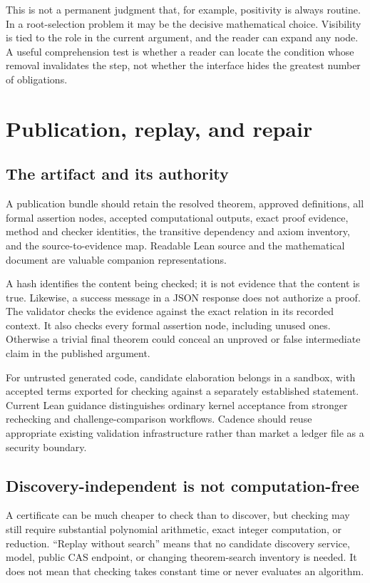 \documentclass[11pt,letterpaper]{article}
\theoremstyle{definition}
\begin{document}
This is not a permanent judgment that, for example, positivity is always routine.
In a root-selection problem it may be the decisive mathematical choice. Visibility
is tied to the role in the current argument, and the reader can expand any node.
A useful comprehension test is whether a reader can locate the condition whose
removal invalidates the step, not whether the interface hides the greatest number
of obligations.

\section{Publication, replay, and repair}\label{sec:replay}
\subsection{The artifact and its authority}
A publication bundle should retain the resolved theorem, approved definitions,
all formal assertion nodes, accepted computational outputs, exact proof evidence,
method and checker identities, the transitive dependency and axiom inventory,
and the source-to-evidence map. Readable Lean source and the mathematical document
are valuable companion representations.

A hash identifies the content being checked; it is not evidence that the content
is true. Likewise, a success message in a JSON response does not authorize a proof.
The validator checks the evidence against the exact relation in its recorded
context. It also checks every formal assertion node, including unused ones.
Otherwise a trivial final theorem could conceal an unproved or false intermediate
claim in the published argument.

For untrusted generated code, candidate elaboration belongs in a sandbox, with
accepted terms exported for checking against a separately established statement.
Current Lean guidance distinguishes ordinary kernel acceptance from stronger
rechecking and challenge-comparison workflows\cite{leanvalidation}. Cadence should
reuse appropriate existing validation infrastructure rather than market a ledger
file as a security boundary.

\subsection{Discovery-independent is not computation-free}
A certificate can be much cheaper to check than to discover, but checking may still
require substantial polynomial arithmetic, exact integer computation, or reduction.
``Replay without search'' means that no candidate discovery service, model, public
CAS endpoint, or changing theorem-search inventory is needed. It does not mean
that checking takes constant time or never evaluates an algorithm.
\end{document}
